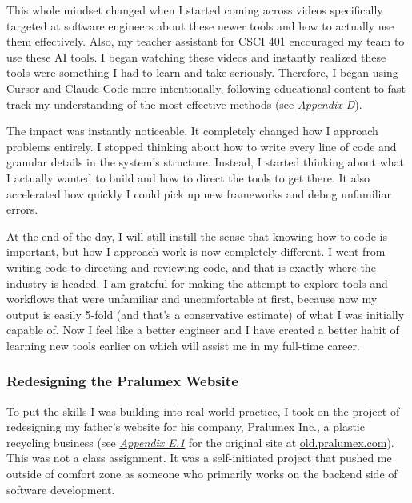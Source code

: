\documentclass[12pt]{article}
\let\oldhyperref\hyperref
\renewcommand{\hyperref}[2][]{\oldhyperref[#1]{\textit{\uline{#2}}}}
\begin{document}
            This whole mindset changed when I started coming across videos specifically targeted at software engineers about these newer tools and how to actually use them effectively. Also, my teacher assistant for CSCI 401 encouraged my team to use these AI tools. I began watching these videos and instantly realized these tools were something I had to learn and take seriously. Therefore, I began using Cursor and Claude Code more intentionally, following educational content to fast track my understanding of the most effective methods (see \hyperref[appendix:d]{Appendix D}).

            The impact was instantly noticeable. It completely changed how I approach problems entirely. I stopped thinking about how to write every line of code and granular details in the system's structure. Instead, I started thinking about what I actually wanted to build and how to direct the tools to get there. It also accelerated how quickly I could pick up new frameworks and debug unfamiliar errors.

            At the end of the day, I will still instill the sense that knowing how to code is important, but how I approach work is now completely different. I went from writing code to directing and reviewing code, and that is exactly where the industry is headed. I am grateful for making the attempt to explore tools and workflows that were unfamiliar and uncomfortable at first, because now my output is easily 5-fold (and that's a conservative estimate) of what I was initially capable of. Now I feel like a better engineer and I have created a better habit of learning new tools earlier on which will assist me in my full-time career.

            \subsubsection{Redesigning the Pralumex Website}
            \label{sec:pralumex-website}

            To put the skills I was building into real-world practice, I took on the project of redesigning my father's website for his company, Pralumex Inc., a plastic recycling business (see \hyperref[appendix:e1]{Appendix E.1} for the original site at \href{https://old.pralumex.com}{old.pralumex.com}). This was not a class assignment. It was a self-initiated project that pushed me outside of comfort zone as someone who primarily works on the backend side of software development.
\end{document}
